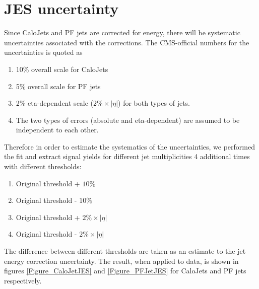 \documentclass{cmspaper2}
\begin{document}


\section{JES uncertainty}

Since CaloJets and PF jets are corrected for energy, there will be systematic uncertainties associated with the corrections.
The CMS-official numbers for the uncertainties is quoted as

\begin{enumerate}
\item 10\% overall scale for CaloJets
\item 5\% overall scale for PF jets
\item 2\% eta-dependent scale ($2\% \times |\eta|$) for both types of jets.
\item The two types of errors (absolute and eta-dependent) are assumed to be independent to each other.
\end{enumerate}

Therefore in order to estimate the systematics of the uncertainties, we performed the fit and extract signal yields for different jet multiplicities 4 additional times with different thresholds:

\begin{enumerate}
\item Original threshold + $10\%$
\item Original threshold - $10\%$
\item Original threshold + $2\% \times |\eta|$
\item Original threshold - $2\% \times |\eta|$
\end{enumerate}

The difference between different thresholds are taken as an estimate to the jet energy correction uncertainty.
The result, when applied to data, is shown in figures \ref{Figure_CaloJetJES} and \ref{Figure_PFJetJES} for CaloJets and PF jets respectively.
\end{document}
